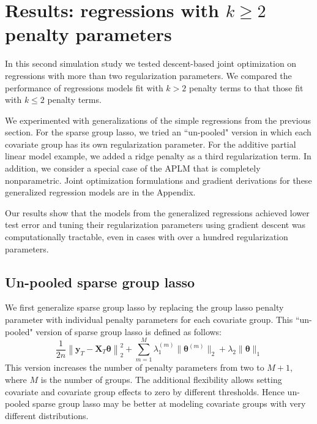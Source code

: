 \documentclass{statsoc}
\begin{document}
\section{Results: regressions with $k\ge 2$ penalty parameters}\label{results2}

In this second simulation study we tested descent-based joint optimization on regressions with more than two regularization parameters. We compared the performance of regressions models fit with $k>2$ penalty terms to that those fit with $k \le 2$ penalty terms.

We experimented with generalizations of the simple regressions from the previous section. For the sparse group lasso, we tried an ``un-pooled" version in which each covariate group has its own regularization parameter. For the additive partial linear model example, we added a ridge penalty as a third regularization term. In addition, we consider a special case of the APLM that is completely nonparametric. Joint optimization formulations and gradient derivations for these generalized regression models are in the Appendix.

Our results show that the models from the generalized regressions achieved lower test error and tuning their regularization parameters using gradient descent was computationally tractable, even in cases with over a hundred regularization parameters.

\subsection{Un-pooled sparse group lasso}

We first generalize sparse group lasso by replacing the group lasso penalty parameter with individual penalty parameters for each covariate group. This ``un-pooled" version of sparse group lasso is defined as follows:
\begin{equation}
\frac{1}{2n} 
\left \| \boldsymbol{y}_T - \boldsymbol{X}_T \boldsymbol{\theta} \right \|^2_2
+ \sum_{m=1}^M \lambda_1^{(m)} \| \boldsymbol \theta^{(m)} \|_2
+ \lambda_2 \| \boldsymbol \theta \|_1
\label{unpooledSGL}
\end{equation}
This version increases the number of penalty parameters from two to $M+1$, where $M$ is the number of groups. The additional flexibility allows setting covariate and covariate group effects to zero by different thresholds. Hence un-pooled sparse group lasso may be better at modeling covariate groups with very different distributions.
\end{document}
